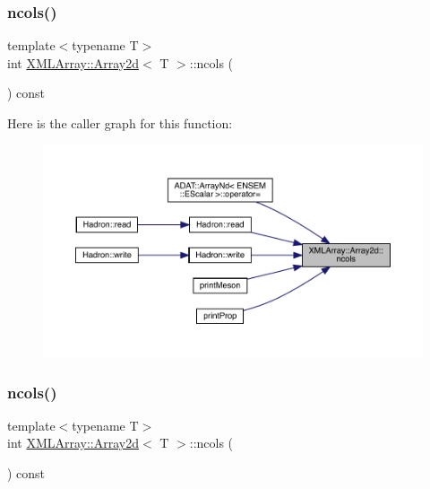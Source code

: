 \subsubsection{\texorpdfstring{ncols()}{ncols()}\hspace{0.1cm}{\footnotesize\ttfamily [1/3]}}
{\footnotesize\ttfamily template$<$typename T$>$ \\
int \mbox{\hyperlink{classXMLArray_1_1Array2d}{X\+M\+L\+Array\+::\+Array2d}}$<$ T $>$\+::ncols (\begin{DoxyParamCaption}{ }\end{DoxyParamCaption}) const\hspace{0.3cm}{\ttfamily [inline]}}

Here is the caller graph for this function\+:
\nopagebreak
\begin{figure}[H]
\begin{center}
\leavevmode
\includegraphics[width=350pt]{dc/ddc/classXMLArray_1_1Array2d_a9eecadb91fe97638a8d7adce77b0a562_icgraph}
\end{center}
\end{figure}
\mbox{\label{classXMLArray_1_1Array2d_a9eecadb91fe97638a8d7adce77b0a562}} 
\subsubsection{\texorpdfstring{ncols()}{ncols()}\hspace{0.1cm}{\footnotesize\ttfamily [2/3]}}
{\footnotesize\ttfamily template$<$typename T$>$ \\
int \mbox{\hyperlink{classXMLArray_1_1Array2d}{X\+M\+L\+Array\+::\+Array2d}}$<$ T $>$\+::ncols (\begin{DoxyParamCaption}{ }\end{DoxyParamCaption}) const\hspace{0.3cm}{\ttfamily [inline]}}


